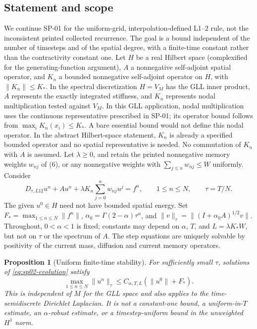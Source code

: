 \documentclass[11pt,a4paper]{amsart}
\theoremstyle{remark}
\theoremstyle{plain}
\newtheorem{proposition}{Proposition}[section]
\theoremstyle{remark}
\numberwithin{equation}{section}
\begin{document}
\subsection{Statement and scope}
We continue SP-01 for the uniform-grid, interpolation-defined L1--2 rule, not the inconsistent printed collected recurrence. The goal is a bound independent of the number of timesteps and of the spatial degree, with a finite-time constant rather than the contractivity constant one. Let $H$ be a real Hilbert space (complexified for the generating-function argument), $A$ a nonnegative self-adjoint spatial operator, and $K_n$ a bounded nonnegative self-adjoint operator on $H$, with $\|K_n\|\le K_*$. In the spectral discretization $H=V_M$ has the GLL inner product, $A$ represents the exactly integrated stiffness, and $K_n$ represents nodal multiplication tested against $V_M$. In this GLL application, nodal multiplication uses the continuous representative prescribed in SP-01; its operator bound follows from $\max_i K_n(x_i)\le K_*$. A bare essential bound would not define this nodal operator. In the abstract Hilbert-space statement, $K_n$ is already a specified bounded operator and no spatial representative is needed. No commutation of $K_n$ with $A$ is assumed. Let $\lambda\ge0$, and retain the printed nonnegative memory weights $w_{nj}$ of (6), or any nonnegative weights with $\sum_{j\le n}w_{nj}\le W$ uniformly. Consider
\begin{equation}\label{eq:sp02-evolution}
 D_{\tau,L12}u^n+Au^n+\lambda K_n\sum_{j=0}^nw_{nj}u^j=f^n,
 \qquad 1\le n\le N,\qquad \tau=T/N.
\end{equation}
The given $u^0\in H$ need not have bounded spatial energy. Set $F_* =\max_{1\le n\le N}\|f^n\|$, $\alpha_0=\Gamma(2-\alpha)\tau^\alpha$, and $\|v\|_\tau=\|(I+\alpha_0 A)^{1/2}v\|$. Throughout, $0<\alpha<1$ is fixed; constants may depend on $\alpha$, $T$, and $L=\lambda K_*W$, but not on $\tau$ or the spectrum of $A$. The step equations are uniquely solvable by positivity of the current mass, diffusion and current memory operators.

\begin{proposition}[Uniform finite-time stability]\label{prop:sp02-stability}
For sufficiently small $\tau$, solutions of \eqref{eq:sp02-evolution} satisfy
\[
 \max_{1\le n\le N}\|u^n\|_\tau\le C_{\alpha,T,L}(\|u^0\|+F_*).
\]
This is independent of $M$ for the GLL space and also applies to the time-semidiscrete Dirichlet Laplacian. It is not a constant-one bound, a uniform-in-$T$ estimate, an $\alpha$-robust estimate, or a timestep-uniform bound in the unweighted $H^1$ norm.
\end{proposition}
\end{document}
